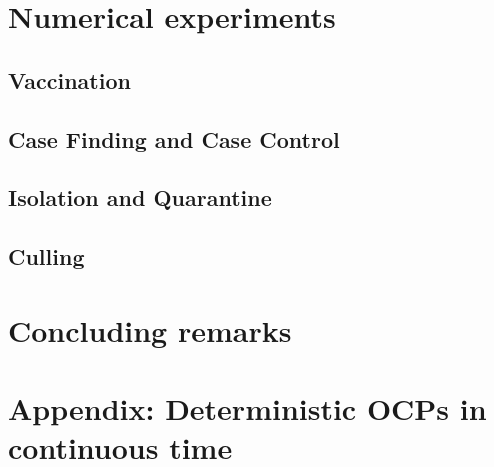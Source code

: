 \documentclass[titlepage]{amsart}
\begin{document}
  \section{Numerical experiments}
    \subsection{Vaccination}
      
    \subsection{Case Finding and Case Control}
      
    \subsection{Isolation and Quarantine}
      
    \subsection{Culling}
      
%
%
  \section{Concluding remarks}
%
  \section{Appendix: Deterministic OCPs in continuous time}
    
%
%
  
  
\end{document}
